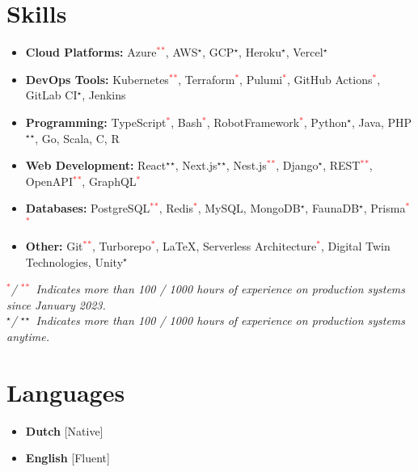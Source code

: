 \section{Skills}
{
	\newcommand{\skilled}{\textcolor{black}{$^\star$}}
	\newcommand{\sskilled}{\skilled\skilled}
	\newcommand{\skilledRecent}{\textcolor{red}{$^*$}}
	\newcommand{\sskilledRecent}{\skilledRecent\skilledRecent}
			
	\begin{itemize}[label=\textbullet]
		\item {\textbf{Cloud Platforms:} Azure\sskilledRecent, AWS\skilled, GCP\skilled, Heroku\skilled, Vercel\skilled}
		\item {\textbf{DevOps Tools:} Kubernetes\sskilledRecent, Terraform\skilledRecent, Pulumi\skilledRecent, GitHub Actions\skilledRecent, GitLab CI\skilled, Jenkins}
		\item {\textbf{Programming:} TypeScript\skilledRecent, Bash\skilledRecent, RobotFramework\skilledRecent, Python\skilled, Java, PHP\sskilled, Go, Scala, C, R}
		\item {\textbf{Web Development:} React\sskilled, Next.js\sskilled, Nest.js\sskilledRecent, Django\skilled, REST\sskilledRecent, OpenAPI\sskilledRecent, GraphQL\skilledRecent}
		\item {\textbf{Databases:} PostgreSQL\sskilledRecent, Redis\skilledRecent, MySQL, MongoDB\skilled, FaunaDB\skilled, Prisma\sskilledRecent}
		\item {\textbf{Other:} Git\sskilledRecent, Turborepo\skilledRecent, LaTeX, Serverless Architecture\skilledRecent, Digital Twin Technologies, Unity\skilled}
	\end{itemize}
	{\footnotesize%
		\vspace{-2mm}%
		\emph{%
			\hspace*{4mm}\skilledRecent / \sskilledRecent~Indicates more than 100 / 1000 hours of experience on production systems since January 2023.
			} \\
		\emph{%
			\hspace*{4mm}\skilled / \sskilled~Indicates more than 100 / 1000 hours of experience on production systems anytime.}
	}
			        
}
    

\Needspace{3cm} %
\section{Languages}{
 \begin{multicols}{2}
 	\begin{itemize}[label=\textbullet]
 		\item \textbf{Dutch} [Native]
 		\item \textbf{English} [Fluent]
 	\end{itemize}
 \end{multicols}
}

